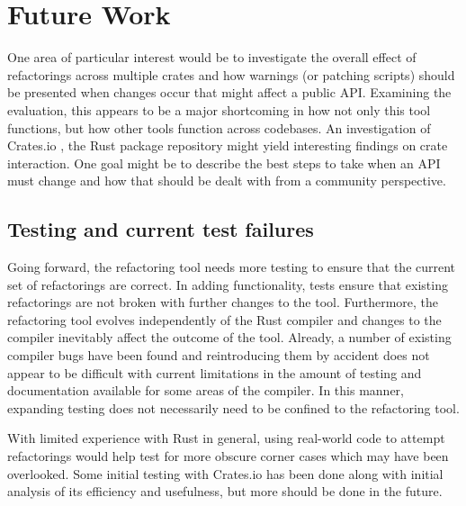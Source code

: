 \section{Future Work}

One area of particular interest would be to investigate the overall effect of refactorings across multiple crates and how warnings (or patching scripts) should be presented when changes occur that might affect a public API. Examining the evaluation, this appears to be a major shortcoming in how not only this tool functions, but how other tools function across codebases. An investigation of Crates.io \cite{cratesio15}, the Rust package repository might yield interesting findings on crate interaction. One goal might be to describe the best steps to take when an API must change and how that should be dealt with from a community perspective. 


\subsection{Testing and current test failures}
Going forward, the refactoring tool needs more testing to ensure that the current set of refactorings are correct. In adding functionality, tests ensure that existing refactorings are not broken with further changes to the tool. Furthermore, the refactoring tool evolves independently of the Rust compiler and changes to the compiler inevitably affect the outcome of the tool. Already, a number of existing compiler bugs have been found and reintroducing them by accident does not appear to be difficult with current limitations in the amount of testing and documentation available for some areas of the compiler. In this manner, expanding testing does not necessarily need to be confined to the refactoring tool. 


With limited experience with Rust in general, using real-world code to attempt refactorings would help test for more obscure corner cases which may have been overlooked. Some initial testing with Crates.io \cite{cratesio15} has been done along with initial analysis of its efficiency and usefulness, but more should be done in the future. 


